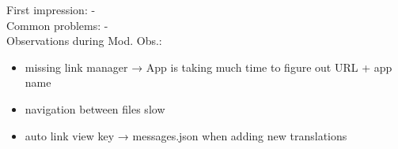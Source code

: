 First impression: -\\
Common problems: -\\
Observations during Mod. Obs.:
\begin{itemize}[nosep]
  \item missing link manager → App is taking much time to figure out URL + app name
  \item navigation between files slow
  \item auto link view key → messages.json when adding new translations
\end{itemize}
